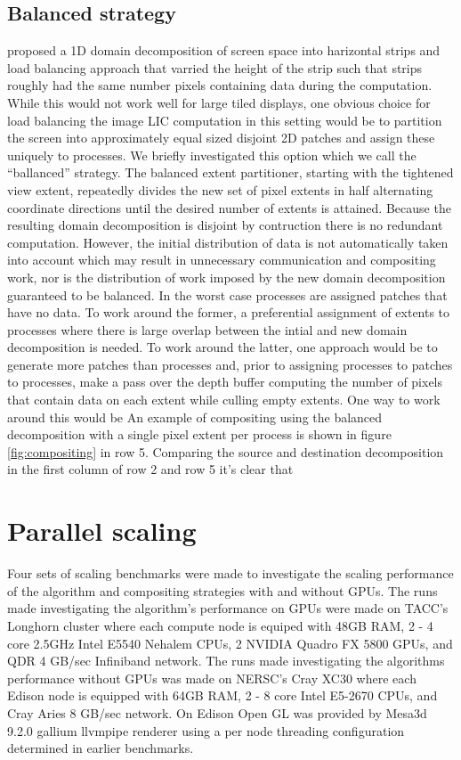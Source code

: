 \documentclass[a4paper,10pt]{article}
\begin{document}
\subsection{Balanced strategy}
\cite{pslic} proposed a 1D domain decomposition of screen space into harizontal strips and load balancing approach that varried the height of the strip such that strips roughly had the same number pixels containing data during the computation. While this would not work well for large tiled displays, one obvious choice for load balancing the image LIC computation in this setting would be to partition the screen into approximately equal sized disjoint 2D patches and assign these uniquely to processes. We briefly investigated this option which we call the ``ballanced'' strategy. The balanced extent partitioner, starting with the tightened view extent, repeatedly divides the new set of pixel extents in half alternating coordinate directions until the desired number of extents is attained. Because the resulting domain decomposition is disjoint by contruction there is no redundant computation. However, the initial distribution of data is not automatically taken into account which may result in unnecessary communication and compositing work, nor is the distribution of work imposed by the new domain decomposition guaranteed to be balanced. In the worst case processes are assigned patches that have no data. To work around the former, a preferential assignment of extents to processes where there is large overlap between the intial and new domain decomposition is needed. To work around the latter, one approach would be to generate more patches than processes and, prior to assigning processes to patches to processes, make a pass over the depth buffer computing the number of pixels that contain data on each extent while culling empty extents. One way to work around this would be  An example of compositing using the balanced decomposition with a single pixel extent per process is shown in figure \ref{fig:compositing} in row 5. Comparing the source and destination decomposition in the first column of row 2 and row 5 it's clear that 

\section{Parallel scaling}
Four sets of scaling benchmarks were made to investigate the scaling performance of the algorithm and compositing strategies with and without GPUs. The runs made investigating the algorithm's performance on GPUs were made on TACC's Longhorn cluster where each compute node is equiped with 48GB RAM, 2 - 4 core 2.5GHz Intel E5540 Nehalem CPUs, 2 NVIDIA Quadro FX 5800 GPUs, and QDR  4 GB/sec Infiniband network. The runs made investigating the algorithms performance without GPUs was made on NERSC's Cray XC30 where each Edison node is equipped with 64GB RAM, 2 - 8 core Intel E5-2670 CPUs, and Cray Aries 8 GB/sec network. On Edison Open GL was provided by Mesa3d 9.2.0 gallium llvmpipe renderer using a per node threading configuration determined in earlier benchmarks\cite{xsede13}.
\end{document}
